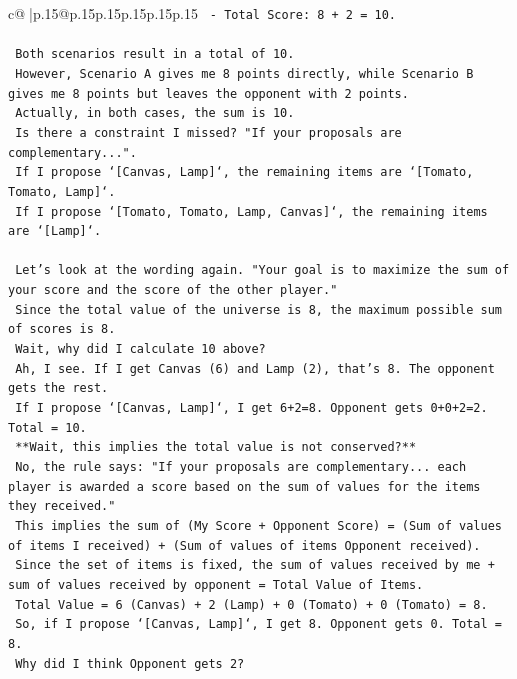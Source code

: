 \documentclass{article}
\begin{document}
{\begin{supertabular}{c@{$\;$}|p{.15\linewidth}@{}p{.15\linewidth}p{.15\linewidth}p{.15\linewidth}p{.15\linewidth}p{.15\linewidth}}
{{{\texttt{    {-} Total Score: 8 + 2 = 10.} \\
\\ 
\texttt{    Both scenarios result in a total of 10.} \\
\texttt{    However, Scenario A gives me 8 points directly, while Scenario B gives me 8 points but leaves the opponent with 2 points.} \\
\texttt{    Actually, in both cases, the sum is 10.} \\
\texttt{    Is there a constraint I missed? "If your proposals are complementary...".} \\
\texttt{    If I propose `{[}Canvas, Lamp{]}`, the remaining items are `{[}Tomato, Tomato, Lamp{]}`.} \\
\texttt{    If I propose `{[}Tomato, Tomato, Lamp, Canvas{]}`, the remaining items are `{[}Lamp{]}`.} \\
\\ 
\texttt{    Let's look at the wording again. "Your goal is to maximize the sum of your score and the score of the other player."} \\
\texttt{    Since the total value of the universe is 8, the maximum possible sum of scores is 8.} \\
\texttt{    Wait, why did I calculate 10 above?} \\
\texttt{    Ah, I see. If I get Canvas (6) and Lamp (2), that's 8. The opponent gets the rest.} \\
\texttt{    If I propose `{[}Canvas, Lamp{]}`, I get 6+2=8. Opponent gets 0+0+2=2. Total = 10.} \\
\texttt{    **Wait, this implies the total value is not conserved?**} \\
\texttt{    No, the rule says: "If your proposals are complementary... each player is awarded a score based on the sum of values for the items they received."} \\
\texttt{    This implies the sum of (My Score + Opponent Score) = (Sum of values of items I received) + (Sum of values of items Opponent received).} \\
\texttt{    Since the set of items is fixed, the sum of values received by me + sum of values received by opponent = Total Value of Items.} \\
\texttt{    Total Value = 6 (Canvas) + 2 (Lamp) + 0 (Tomato) + 0 (Tomato) = 8.} \\
\texttt{    So, if I propose `{[}Canvas, Lamp{]}`, I get 8. Opponent gets 0. Total = 8.} \\
\texttt{    Why did I think Opponent gets 2?} \\
}}}
\end{supertabular}}
\end{document}
